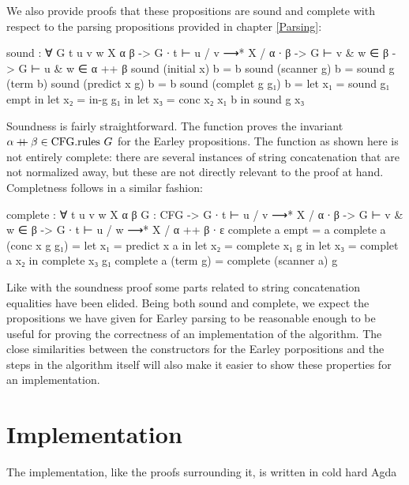 		We also provide proofs that these propositions are sound and complete
		with respect to the parsing propositions provided in chapter
		\ref{Parsing}:

		\begin{code}

			sound : ∀ {G t u v w X α β} ->
			  G ∙ t ⊢ u / v ⟶* X / α ∙ β ->
			    G ⊢ v & w ∈ β ->
			    G ⊢ u & w ∈ α ++ β
			sound (initial x) b = b
			sound (scanner g) b = sound g (term b)
			sound (predict x g) b = b
			sound (complet g g₁) b =
			  let x₁ = sound g₁ empt in
			  let x₂ = in-g g₁ in
			  let x₃ = conc x₂ x₁ b in
			  sound g x₃
			
		\end{code}
	
		Soundness is fairly straightforward. The  function proves 
		the invariant $\alpha \mathbin{{+}\mspace{-8mu}{+}} \beta \in \textrm{CFG.rules } G$ for the 
		Earley propositions. The function as shown here is not entirely 
		complete: there are several instances of string concatenation that 
		are not normalized away, but these are not directly relevant to the 
		proof at hand. Completness follows in a similar fashion:
		
		\begin{code}

			complete : ∀ {t u v w X α β} {G : CFG} ->
			  G ∙ t ⊢ u / v ⟶* X / α ∙ β ->
			  G ⊢ v & w ∈ β ->
			    G ∙ t ⊢ u / w ⟶* X / α ++ β ∙ ε
			complete a empt = a
			complete a (conc x g g₁) =
			  let x₁ = predict x a in
			  let x₂ = complete x₁ g in
			  let x₃ = complet a x₂ in
			  complete x₃ g₁
			complete a (term g) = complete (scanner a) g
	
		\end{code}

		Like with the soundness proof some parts related to string 
		concatenation equalities have been elided. Being both sound and 
		complete, we expect the propositions we have given for Earley parsing
		to be reasonable enough to be useful for proving the correctness of an 
		implementation of the algorithm. The close similarities between the 
		constructors for the Earley porpositions and the steps in the algorithm 
		itself will also make it easier to show these properties for an 
		implementation.
	
	\section{Implementation}

		The implementation, like the proofs surrounding it, is written in cold 
		hard Agda

